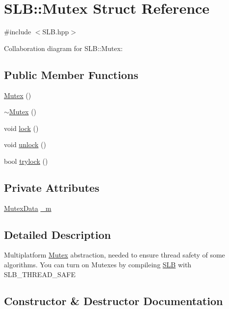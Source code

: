\hypertarget{structSLB_1_1Mutex}{}\section{S\+LB\+:\+:Mutex Struct Reference}
\label{structSLB_1_1Mutex}


{\ttfamily \#include $<$S\+L\+B.\+hpp$>$}



Collaboration diagram for S\+LB\+:\+:Mutex\+:
\subsection*{Public Member Functions}
\begin{DoxyCompactItemize}
\item 
\hyperlink{structSLB_1_1Mutex_a1099a5828eb4c3fdce6cb5cc908fc133}{Mutex} ()
\item 
\hyperlink{structSLB_1_1Mutex_aa89d80f84b709aa374bab886cc1cf91e}{$\sim$\+Mutex} ()
\item 
void \hyperlink{structSLB_1_1Mutex_ada93deda839003f2847e4be4c6171494}{lock} ()
\item 
void \hyperlink{structSLB_1_1Mutex_adf47de629b85eeb9bdeaa510fe9b32e1}{unlock} ()
\item 
bool \hyperlink{structSLB_1_1Mutex_ad5d2c735aacc0ca670d3730fb494803d}{trylock} ()
\end{DoxyCompactItemize}
\subsection*{Private Attributes}
\begin{DoxyCompactItemize}
\item 
\hyperlink{structSLB_1_1MutexData}{Mutex\+Data} \hyperlink{structSLB_1_1Mutex_a1db7e024cf2ed1ef3c37278b6689fa96}{\+\_\+m}
\end{DoxyCompactItemize}


\subsection{Detailed Description}
Multiplatform \hyperlink{structSLB_1_1Mutex}{Mutex} abstraction, needed to ensure thread safety of some algorithms. You can turn on Mutexes by compileing \hyperlink{namespaceSLB}{S\+LB} with S\+L\+B\+\_\+\+T\+H\+R\+E\+A\+D\+\_\+\+S\+A\+FE 

\subsection{Constructor \& Destructor Documentation}
